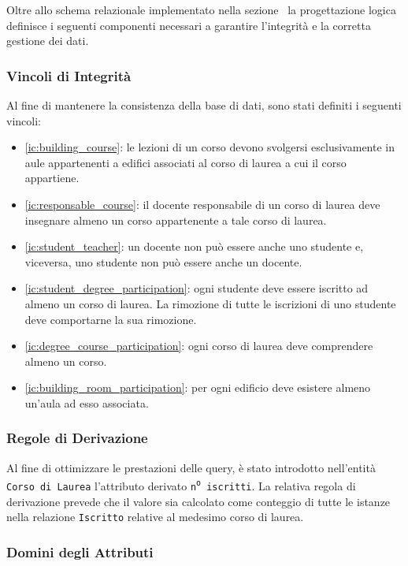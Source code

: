\documentclass[a4paper,11pt]{article}
\begin{document}
Oltre allo schema relazionale implementato nella sezione~ la progettazione logica definisce i seguenti componenti necessari a garantire l'integrità e la corretta gestione dei dati.


\subsubsection{Vincoli di Integrità}

Al fine di mantenere la consistenza della base di dati, sono stati definiti i seguenti vincoli:

\begin{itemize}
    \item \ref{ic:building_course}: le lezioni di un corso devono svolgersi esclusivamente in aule appartenenti a edifici associati al corso di laurea a cui il corso appartiene.
    \item \ref{ic:responsable_course}: il docente responsabile di un corso di laurea deve insegnare almeno un corso appartenente a tale corso di laurea.
    \item \ref{ic:student_teacher}: un docente non può essere anche uno studente e, viceversa, uno studente non può essere anche un docente.
    \item \ref{ic:student_degree_participation}: ogni studente deve essere iscritto ad almeno un corso di laurea. La rimozione di tutte le iscrizioni di uno studente deve comportarne la sua rimozione.
    \item \ref{ic:degree_course_participation}: ogni corso di laurea deve comprendere almeno un corso.
    \item \ref{ic:building_room_participation}: per ogni edificio deve esistere almeno un'aula ad esso associata.
\end{itemize}


\subsubsection{Regole di Derivazione}

Al fine di ottimizzare le prestazioni delle query, è stato introdotto nell'entità \texttt{Corso di Laurea} l'attributo derivato \texttt{n\textsuperscript{o} iscritti}. La relativa regola di derivazione prevede che il valore sia calcolato come conteggio di tutte le istanze nella relazione \texttt{Iscritto} relative al medesimo corso di laurea.


\subsubsection{Domini degli Attributi}
\end{document}
